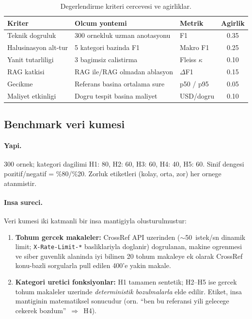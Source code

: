 \documentclass[11pt,a4paper]{article}
\begin{document}
\begin{table}[t]
\caption{Degerlendirme kriteri cercevesi ve agirliklar.}
\label{tab:kriter}\small
\begin{tabularx}{\columnwidth}{l X l c}
\toprule
\textbf{Kriter} & \textbf{Olcum yontemi} & \textbf{Metrik} & \textbf{Agirlik} \\
\midrule
Teknik dogruluk        & 300 ornekluk uzman anotasyonu & F1            & 0.35 \\
Halusinasyon alt-tur   & 5 kategori bazinda F1         & Makro F1      & 0.25 \\
Yanit tutarliligi      & 3 bagimsiz calistirma         & Fleiss $\kappa$ & 0.10 \\
RAG katkisi            & RAG ile/RAG olmadan ablasyon  & $\Delta$F1    & 0.15 \\
Gecikme                & Referans basina ortalama sure & p50 / p95     & 0.05 \\
Maliyet etkinligi      & Dogru tespit basina maliyet   & USD/dogru     & 0.10 \\
\bottomrule
\end{tabularx}
\end{table}

\subsection{Benchmark veri kumesi}
\label{sub:dataset}
\paragraph{Yapi.} 300 ornek; kategori dagilimi H1: 80, H2: 60, H3: 60, H4: 40,
H5: 60. Sinif dengesi pozitif/negatif = \%80/\%20. Zorluk etiketleri (kolay,
orta, zor) her ornege atanmistir.

\paragraph{Insa sureci.} Veri kumesi iki katmanli bir insa mantigiyla
olusturulmustur:

\begin{enumerate}[nosep]
\item \textbf{Tohum gercek makaleler:} CrossRef API uzerinden ($\sim$50~istek/sn
dinamik limit; \texttt{X-Rate-Limit-*} basliklariyla doglanir) dogrulanan,
makine ogrenmesi ve siber guvenlik alaninda iyi bilinen 20 tohum makaleye ek
olarak CrossRef konu-bazli sorgularla pull edilen 400'e yakin makale.
\item \textbf{Kategori uretici fonksiyonlar:} H1 tamamen sentetik;
H2--H5 ise gercek tohum makaleler uzerinde \emph{deterministik bozulmalarla}
elde edilir. Etiket, insa mantiginin matematiksel sonucudur (orn. ``ben bu
referansi yili gelecege cekerek bozdum''~$\Rightarrow$~H4).
\end{enumerate}
\end{document}
